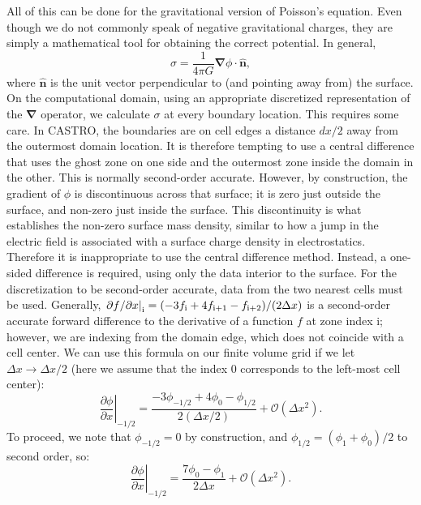 \documentclass[12pt,preprint]{aastex}
\begin{document}
All of this can be done for the gravitational version of Poisson's equation. Even though we do not commonly speak of negative gravitational charges, they are simply a mathematical tool for obtaining the correct potential. In general,
\begin{equation}
  \sigma = \frac{1}{4\pi G} {\bm{\nabla}} \phi \cdot \hat{\mathbf{n}},\label{eq-isolated-sigma}
\end{equation}
where $\hat{\mathbf{n}}$ is the unit vector perpendicular to (and pointing away from) the surface. On the computational domain, using an appropriate discretized representation of the ${\bm{\nabla}}$ operator, we calculate $\sigma$ at every boundary location. This requires some care. In CASTRO, the boundaries are on cell edges a distance $dx / 2$ away from the outermost domain location. It is therefore tempting to use a central difference that uses the ghost zone on one side and the outermost zone inside the domain in the other. This is normally second-order accurate. However, by construction, the gradient of $\phi$ is discontinuous across that surface; it is zero just outside the surface, and non-zero just inside the surface. This discontinuity is what establishes the non-zero surface mass density, similar to how a jump in the electric field is associated with a surface charge density in electrostatics. Therefore it is inappropriate to use the central difference method. Instead, a one-sided difference is required, using only the data interior to the surface. For the discretization to be second-order accurate, data from the two nearest cells must be used. Generally, $\left.\partial f/\partial x\right|_{\rm i} = (-3 f_{\rm i} + 4 f_{\rm i+1} - f_{\rm i+2}) / (2 \Delta x)$ is a second-order accurate forward difference to the derivative of a function $f$ at zone index i; however, we are indexing from the domain edge, which does not coincide with a cell center. We can use this formula on our finite volume grid if we let $\Delta x \to \Delta x / 2$ (here we assume that the index 0 corresponds to the left-most cell center):
\begin{equation*}
  \left.\frac{\partial \phi}{\partial x}\right|_{-1/2} = \frac{-3 \phi_{-1/2} + 4 \phi_{0} - \phi_{1/2}}{2(\Delta x / 2)} + \mathcal{O}(\Delta x^2).
\end{equation*}
To proceed, we note that $\phi_{-1/2} = 0$ by construction, and $\phi_{1/2} = (\phi_{1} + \phi_{0}) / 2$ to second order, so:
\begin{equation}
  \left.\frac{\partial \phi}{\partial x}\right|_{-1/2} = \frac{7\phi_{0} - \phi_{1}}{2\Delta x} + \mathcal{O}(\Delta x^2).
\end{equation}
\end{document}
